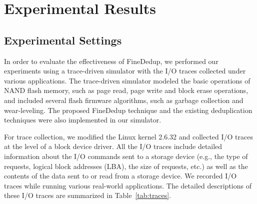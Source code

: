 \section{Experimental Results}
\label{sec:finededup_experimentalresult}


\subsection{Experimental Settings}

In order to evaluate the effectiveness of FineDedup, 
we performed our experiments using a trace-driven simulator with the I/O traces collected under various applications.
The trace-driven simulator modeled the basic operations of NAND flash memory, 
such as page read, page write and block erase operations,
and included several flash firmware algorithms, 
such as garbage collection and wear-leveling.
The proposed FineDedup technique and the existing deduplication techniques were also implemented in our simulator.

For trace collection, 
we modified the Linux kernel 2.6.32 and collected I/O traces at the level of a block device driver.
All the I/O traces include detailed information about the I/O commands sent to a storage device
(e.g., the type of requests, logical block addresses (LBA), the size of requests, etc.) 
as well as the contents of the data sent to or read from a storage device.
We recorded I/O traces while running various real-world applications.
The detailed descriptions of these I/O traces are summarized in Table~\ref{tab:traces}.


